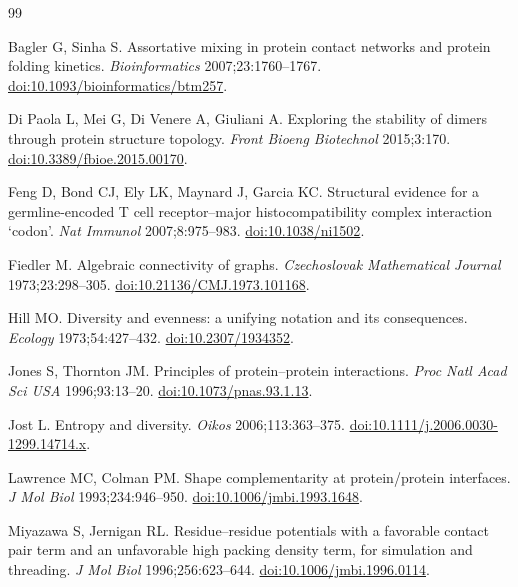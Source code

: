 \documentclass[11pt,a4paper]{article}
\begin{document}
\begin{thebibliography}{99}\small

 Bagler G, Sinha S. Assortative mixing in protein contact networks and
protein folding kinetics. \textit{Bioinformatics} 2007;23:1760--1767.
\href{https://doi.org/10.1093/bioinformatics/btm257}{doi:10.1093/bioinformatics/btm257}.

 Di Paola L, Mei G, Di Venere A, Giuliani A. Exploring the stability of
dimers through protein structure topology. \textit{Front Bioeng Biotechnol} 2015;3:170.
\href{https://doi.org/10.3389/fbioe.2015.00170}{doi:10.3389/fbioe.2015.00170}.

 Feng D, Bond CJ, Ely LK, Maynard J, Garcia KC. Structural evidence for a
germline-encoded T cell receptor--major histocompatibility complex interaction `codon'.
\textit{Nat Immunol} 2007;8:975--983.
\href{https://doi.org/10.1038/ni1502}{doi:10.1038/ni1502}.

 Fiedler M. Algebraic connectivity of graphs.
\textit{Czechoslovak Mathematical Journal} 1973;23:298--305.
\href{https://doi.org/10.21136/CMJ.1973.101168}{doi:10.21136/CMJ.1973.101168}.

 Hill MO. Diversity and evenness: a unifying notation and its consequences.
\textit{Ecology} 1973;54:427--432.
\href{https://doi.org/10.2307/1934352}{doi:10.2307/1934352}.

 Jones S, Thornton JM. Principles of protein--protein interactions.
\textit{Proc Natl Acad Sci USA} 1996;93:13--20.
\href{https://doi.org/10.1073/pnas.93.1.13}{doi:10.1073/pnas.93.1.13}.

 Jost L. Entropy and diversity. \textit{Oikos} 2006;113:363--375.
\href{https://doi.org/10.1111/j.2006.0030-1299.14714.x}{doi:10.1111/j.2006.0030-1299.14714.x}.

 Lawrence MC, Colman PM. Shape complementarity at protein/protein
interfaces. \textit{J Mol Biol} 1993;234:946--950.
\href{https://doi.org/10.1006/jmbi.1993.1648}{doi:10.1006/jmbi.1993.1648}.

 Miyazawa S, Jernigan RL. Residue--residue potentials with a
favorable contact pair term and an unfavorable high packing density term, for simulation and
threading. \textit{J Mol Biol} 1996;256:623--644.
\href{https://doi.org/10.1006/jmbi.1996.0114}{doi:10.1006/jmbi.1996.0114}.


\end{thebibliography}
\end{document}
